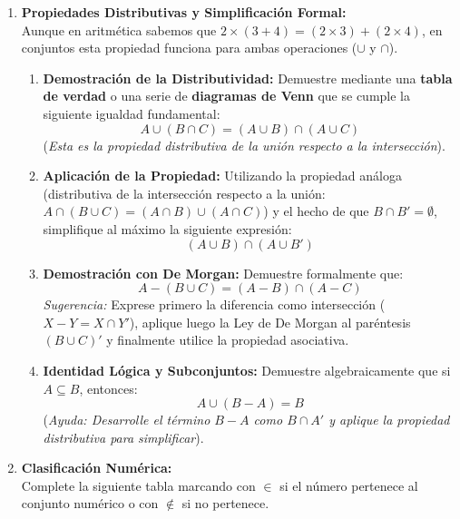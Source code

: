 \begin{enumerate}
    \item \textbf{Propiedades Distributivas y Simplificación Formal:} \\
    Aunque en aritmética sabemos que $2 \times (3 + 4) = (2 \times 3) + (2 \times 4)$, en conjuntos esta propiedad funciona para ambas operaciones ($\cup$ y $\cap$).
    
    \begin{enumerate}
        \item \textbf{Demostración de la Distributividad:}
        Demuestre mediante una \textbf{tabla de verdad} o una serie de \textbf{diagramas de Venn} que se cumple la siguiente igualdad fundamental:
        \[ A \cup (B \cap C) = (A \cup B) \cap (A \cup C) \]
        (\textit{Esta es la propiedad distributiva de la unión respecto a la intersección}).

        \item \textbf{Aplicación de la Propiedad:}
        Utilizando la propiedad análoga (distributiva de la intersección respecto a la unión: $A \cap (B \cup C) = (A \cap B) \cup (A \cap C)$) y el hecho de que $B \cap B' = \emptyset$, simplifique al máximo la siguiente expresión:
        \[ (A \cup B) \cap (A \cup B') \]
        
        \item \textbf{Demostración con De Morgan:}
        Demuestre formalmente que:
        \[ A - (B \cup C) = (A - B) \cap (A - C) \]
        \textit{Sugerencia:} Exprese primero la diferencia como intersección ($X - Y = X \cap Y'$), aplique luego la Ley de De Morgan al paréntesis $(B \cup C)'$ y finalmente utilice la propiedad asociativa.

        \item \textbf{Identidad Lógica y Subconjuntos:}
        Demuestre algebraicamente que si $A \subseteq B$, entonces:
        \[ A \cup (B - A) = B \]
        (\textit{Ayuda: Desarrolle el término $B-A$ como $B \cap A'$ y aplique la propiedad distributiva para simplificar}).
    \end{enumerate}

    \item \textbf{Clasificación Numérica:} \\
    Complete la siguiente tabla marcando con $\in$ si el número pertenece al conjunto numérico o con $\notin$ si no pertenece.


\end{enumerate}

